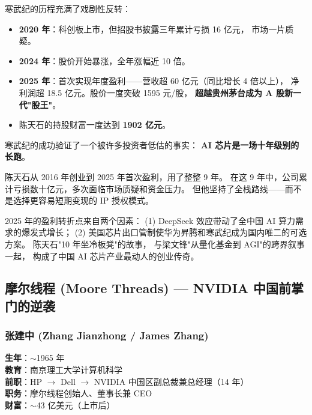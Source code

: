 寒武纪的历程充满了戏剧性反转：
\begin{itemize}[noitemsep]
  \item \textbf{2020 年}：科创板上市，但招股书披露三年累计亏损 16 亿元，
        市场一片质疑。
  \item \textbf{2024 年}：股价开始暴涨，全年涨幅近 10 倍。
  \item \textbf{2025 年}：首次实现年度盈利——营收超 60 亿元（同比增长 4 倍以上），
        净利润超 18.5 亿元。股价一度突破 1595 元/股，
        \textbf{超越贵州茅台成为 A 股新一代"股王"}。
  \item 陈天石的持股财富一度达到 \textbf{1902 亿元}。
\end{itemize}

\begin{corebox}
寒武纪的成功验证了一个被许多投资者低估的事实：
\textbf{AI 芯片是一场十年级别的长跑}。

陈天石从 2016 年创业到 2025 年首次盈利，用了整整 9 年。
在这 9 年中，公司累计亏损数十亿元，多次面临市场质疑和资金压力。
但他坚持了全栈路线——而不是选择更容易短期变现的 IP 授权模式。

2025 年的盈利转折点来自两个因素：
(1) DeepSeek 效应带动了全中国 AI 算力需求的爆发式增长；
(2) 美国芯片出口管制使华为昇腾和寒武纪成为国内唯二的可选方案。
陈天石"10 年坐冷板凳"的故事，
与梁文锋"从量化基金到 AGI"的跨界叙事一起，
构成了中国 AI 芯片产业最动人的创业传奇。
\end{corebox}


\subsection{摩尔线程 (Moore Threads) — NVIDIA 中国前掌门的逆袭}

\subsubsection{张建中 (Zhang Jianzhong / James Zhang)}

\begin{keybox}
\textbf{生年}：$\sim$1965 年 \\
\textbf{教育}：南京理工大学计算机科学 \\
\textbf{前职}：HP $\to$ Dell $\to$ NVIDIA 中国区副总裁兼总经理（14 年）\\
\textbf{职务}：摩尔线程创始人、董事长兼 CEO \\
\textbf{财富}：$\sim$43 亿美元（上市后）
\end{keybox}

